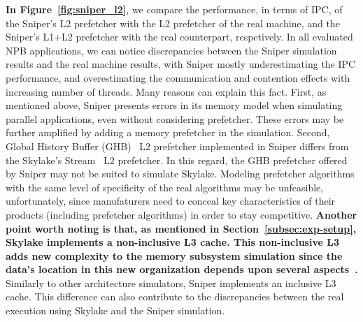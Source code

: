 \documentclass[AMA,final,STIX1COL]{WileyNJD-v2}
\newcommand\new[1]{{\color{red}\textbf{#1}}}
\begin{document}
\textbf{In Figure~\ref{fig:sniper_l2}}, we compare the performance, in terms of IPC, of the Sniper's L2 prefetcher with the L2 prefetcher of the real machine, and the Sniper's L1+L2 prefetcher with the real counterpart, respetively.
In all evaluated NPB applications, we can notice discrepancies between the Sniper simulation results and the real machine results, with Sniper mostly underestimating the IPC performance, and overestimating the communication and contention effects with increasing number of threads.
Many reasons can explain this fact. 
First, as mentioned above, Sniper presents errors in its memory model when simulating parallel applications, even without considering prefetcher. 
These errors may be further amplified by adding a memory prefetcher in the simulation. 
Second, Global History Buffer (GHB)~\cite{nesbit2004data} L2 prefetcher implemented in Sniper differs from the Skylake's Stream~\cite{intelmanual} L2 prefetcher. 
In this regard, the GHB prefetcher offered by Sniper may not be suited to simulate Skylake. 
Modeling prefetcher algorithms with the same level of specificity of the real algorithms may be unfeasible, unfortunately, since manufaturers need to conceal key characteristics of their products (including prefetcher algorithms) in order to stay competitive.
\new{Another point worth noting is that, as mentioned in Section~\ref{subsec:exp-setup}, Skylake implements a non-inclusive L3 cache.
This non-inclusive L3 adds new complexity to the memory subsystem simulation since the data's location in this new organization depends upon several aspects~\cite{intelmanual}.}
Similarly to other architecture simulators, Sniper implements an inclusive L3 cache. This difference can also contribute to the discrepancies between the real execution using Skylake and the Sniper simulation.
\end{document}
